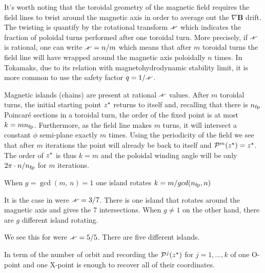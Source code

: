 It's worth noting that the toroidal geometry of the magnetic field requires the field lines to twist around the magnetic axis in order to average out the $\nabla\textbf{B}$ drift. The twisting is quantify by the rotational transform $\iotaslash$ which indicates the fraction of poloidal turns
performed after one toroidal turn. More precisely, if $\iotaslash$ is rational, one can write $\iotaslash = n/m$ which means that after $m$ toroidal turns the field line will have wrapped around the magnetic axis poloidally $n$ times. In Tokamaks, due to its relation with magnetohydrodynamic stability limit, it is more common to use the safety factor $q=1/\iotaslash$.

Magnetic islands (chains) are present at rational $\iotaslash$ values. After $m$ toroidal turns, the initial starting point $z^\star$ returns to itself and, recalling that there is $n_\text{fp}$ Poincaré sections in a toroidal turn, the order of the fixed point is at most $k=mn_\text{fp}$. Furthermore, as the field line makes $m$ turns, it will intersect a constant $\phi$ semi-plane exactly $m$ times. Using the periodicity of the field we see that after $m$ iterations the point will already be back to itself and $\mathcal{P}^m(z^\star) = z^\star$. The order of $z^\star$ is thus $k=m$ and the poloidal winding angle will be only $2\pi\cdot n/n_\text{fp}$ for $m$ iterations. 

When $g = \gcd{(m,\,n)} = 1$ one island rotates 
$k = m/gcd(n_\text{fp}, n)$


It is the case in  were $\iotaslash = 3/7$. There is one island that rotates around the magnetic axis and gives the 7 intersections. When $g \neq 1$ on the other hand, there are $g$ different island rotating. 

We see this for  were $\iotaslash = 5/5$. There are five different islands.

In term of the number of orbit
and recording the $\mathcal{P}^j(z^\star)$ for $j = 1, ..., k$ of one O-point and one X-point is enough to recover all of their coordinates.




